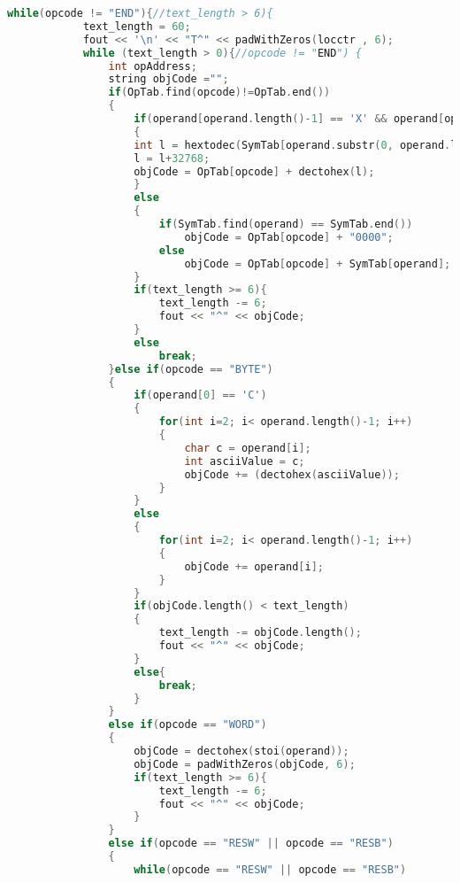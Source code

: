 \documentclass[12pt]{article}
\begin{document}
\begin{lstlisting}[language=C++, caption={Pass 2 - Object Code Generator}]
        while(opcode != "END"){//text_length > 6){
            text_length = 60;
            fout << '\n' << "T^" << padWithZeros(locctr , 6);
            while (text_length > 0){//opcode != "END") {
                int opAddress;
                string objCode ="";
                if(OpTab.find(opcode)!=OpTab.end())
                {
                    if(operand[operand.length()-1] == 'X' && operand[operand.length()-2] == ',')
                    {
                    int l = hextodec(SymTab[operand.substr(0, operand.length()-2)]);
                    l = l+32768;
                    objCode = OpTab[opcode] + dectohex(l);
                    }
                    else
                    {
                        if(SymTab.find(operand) == SymTab.end())
                            objCode = OpTab[opcode] + "0000";
                        else
                            objCode = OpTab[opcode] + SymTab[operand];
                    }
                    if(text_length >= 6){
                        text_length -= 6;
                        fout << "^" << objCode;
                    }
                    else
                        break;
                }else if(opcode == "BYTE")
                {
                    if(operand[0] == 'C')
                    {
                        for(int i=2; i< operand.length()-1; i++)
                        {
                            char c = operand[i];
                            int asciiValue = c;
                            objCode += (dectohex(asciiValue));
                        }
                    }
                    else 
                    {
                        for(int i=2; i< operand.length()-1; i++)
                        {
                            objCode += operand[i];
                        }
                    }
                    if(objCode.length() < text_length)
                    {
                        text_length -= objCode.length();
                        fout << "^" << objCode;
                    }
                    else{
                        break;
                    }        
                }
                else if(opcode == "WORD")
                {
                    objCode = dectohex(stoi(operand));
                    objCode = padWithZeros(objCode, 6);
                    if(text_length >= 6){
                        text_length -= 6;
                        fout << "^" << objCode;
                    }
                }
                else if(opcode == "RESW" || opcode == "RESB")
                {
                    while(opcode == "RESW" || opcode == "RESB")

\end{lstlisting}
\end{document}
